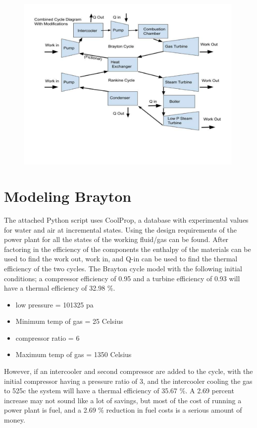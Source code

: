 \documentclass{article}
\begin{document}
\begin{figure}[!htbp]
\centering
  \includegraphics[page=1,trim=10mm 0mm 10mm 0mm,clip,width=0.99\textwidth]{Figures/Copy of Combined Cycle Diagram.pdf}
  \caption{}
  \label{fig:epsfig}
\end{figure}

\FloatBarrier

\section{Modeling Brayton}

The attached Python script uses CoolProp, a database with experimental values for water and air at incremental states. Using the design requirements of the power plant for all the states of the working fluid/gas can be found. After factoring in the efficiency of the components the enthalpy of the materials can be used to find the work out, work in, and Q-in can be used to find the thermal efficiency of the two cycles. The Brayton cycle model with the following initial conditions; a compressor efficiency of 0.95 and a turbine efficiency of 0.93 will have a thermal efficiency of 32.98 \%.
\begin{itemize}
\item  low pressure = 101325 pa
\item Minimum temp of gas = 25 Celsius
\item compressor ratio = 6
\item Maximum temp of gas = 1350 Celsius
\end{itemize}

However, if an intercooler and second compressor are added to the cycle, with the initial compressor having a pressure ratio of 3, and the intercooler cooling the gas to 525c the system will have a thermal efficiency of 35.67 \%.  A 2.69 percent increase may not sound like a lot of savings, but most of the cost of running a power plant is fuel, and a 2.69 \% reduction in fuel costs is a serious amount of money.
\end{document}
